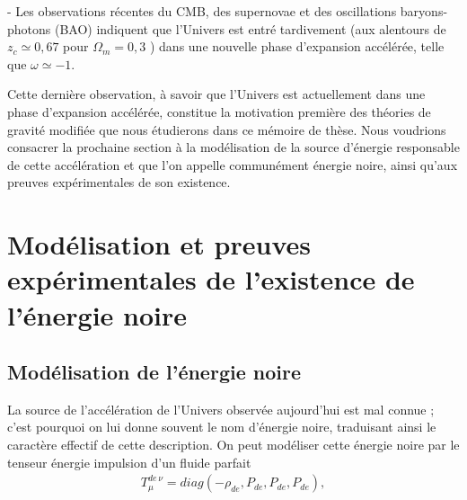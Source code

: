 \documentclass[a4paper,12pt]{report}
\theoremstyle{plain}
\theoremstyle{plain}
\begin{document}
- Les observations r\'ecentes du CMB, des supernovae et des oscillations baryons-photons
(BAO) indiquent que l'Univers est entr\'e tardivement (aux alentours de \cite{75}   $ z_c \simeq 0,67 $
pour   $ \Omega_m = 0,3 $ ) dans une nouvelle phase d'expansion acc\'el\'er\'ee, telle que  $  \omega \simeq -1  $.

Cette derni\`ere observation, \`a savoir que l'Univers est actuellement dans une phase 
d'expansion acc\'el\'er\'ee, constitue la motivation premi\`ere des th\'eories de gravit\'e modifi\'ee que
nous \'etudierons dans ce m\'emoire de th\`ese.
Nous voudrions
consacrer la prochaine section \`a la mod\'elisation de la source d'\'energie responsable de
cette acc\'el\'eration et que l'on appelle commun\'ement \'energie noire, ainsi qu'aux preuves
exp\'erimentales de son existence.

\section{Mod\'elisation et preuves exp\'erimentales de l'existence de
l'\'energie noire}
\subsection{Mod\'elisation de l'\'energie noire}
La source de l'acc\'el\'eration de l'Univers observ\'ee aujourd'hui est mal connue ; c'est
pourquoi on lui donne souvent le nom d'\'energie noire, traduisant ainsi le caract\`ere effectif
de cette description. On peut mod\'eliser cette \'energie noire par le tenseur \'energie impulsion
d'un fluide parfait
\begin{eqnarray}
 T_\mu^{de\, \nu} = diag( -\rho_{de}, P_{de}, P_{de}, P_{de}), \label{gene22}
\end{eqnarray}
\end{document}
